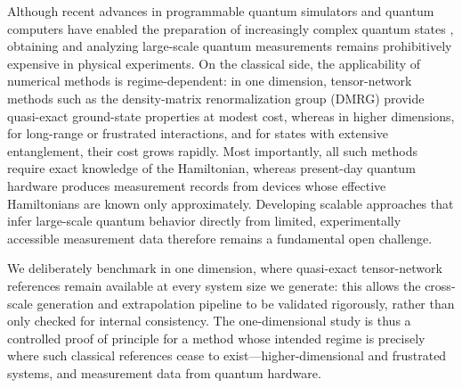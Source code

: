 

Although recent advances in programmable quantum simulators and quantum
computers have enabled the preparation of increasingly complex quantum
states \cite{bourgund2025formation, king2025beyond}, obtaining and
analyzing large-scale quantum measurements remains prohibitively expensive
in physical experiments. On the classical side, the applicability of
numerical methods is regime-dependent: in one dimension, tensor-network
methods such as the density-matrix renormalization group (DMRG) provide
quasi-exact ground-state properties at modest cost, whereas in higher
dimensions, for long-range or frustrated interactions, and for states with
extensive entanglement, their cost grows rapidly. Most importantly, all
such methods require exact knowledge of the Hamiltonian, whereas
present-day quantum hardware produces measurement records from devices
whose effective Hamiltonians are known only approximately. Developing
scalable approaches that infer large-scale quantum behavior directly from
limited, experimentally accessible measurement data therefore remains a
fundamental open challenge.


We deliberately benchmark in one dimension, where quasi-exact
tensor-network references remain available at every system size we
generate: this allows the cross-scale generation and extrapolation
pipeline to be validated rigorously, rather than only checked for internal
consistency. The one-dimensional study is thus a controlled proof of
principle for a method whose intended regime is precisely where such
classical references cease to exist---higher-dimensional and frustrated
systems, and measurement data from quantum hardware.

